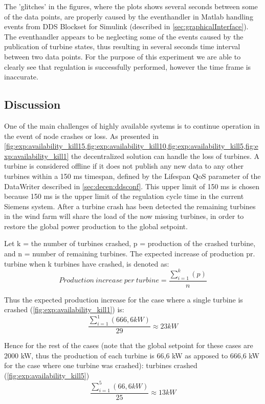 \FloatBarrier

The 'glitches' in the figures, where the plots shows several seconds between some of the data points, are properly caused by the eventhandler in Matlab handling events from DDS Blockset for Simulink (described in \cref{sec:graphicalInterface}). The eventhandler appears to be neglecting some of the events caused by the publication of turbine states, thus resulting in several seconds time interval between two data points. For the purpose of this experiment we are able to clearly see that regulation is successfully performed, however the time frame is inaccurate.

\subsection{Discussion}
One of the main challenges of highly available systems is to continue operation in the event of node crashes or loss. As presented in  \cref{fig:exp:availability_kill15,fig:exp:availability_kill10,fig:exp:availability_kill5,fig:exp:availability_kill1} the decentralized solution can handle the loss of turbines. A turbine is considered offline if it does not publish any new data to any other turbines within a 150 ms timespan, defined by the Lifespan QoS parameter of the DataWriter described in \cref{sec:decen:ddsconf}.
This upper limit of 150 ms is chosen because 150 ms is the upper limit of the regulation cycle time in the current Siemens system.
After a turbine crash has been detected the remaining turbines in the wind farm will share the load of the now missing turbines, in order to restore the global power production to the global setpoint.

Let k = the number of turbines crashed, p = production of the crashed turbine, and n = number of remaining turbines. The expected increase of production pr. turbine when k turbines have crashed, is denoted as: 
$$Production~increase~per~turbine = \frac{\sum\limits_{i=1}^k(p)}{n}$$

Thus the expected production increase for the case where a single turbine is crashed (\cref{fig:exp:availability_kill1}) is: $$\frac{\sum\limits_{i=1}^1(666,6kW)}{29}\approx23kW$$

Hence for the rest of the cases (note that the global setpoint for these cases are 2000 kW, thus the production of each turbine is 66,6 kW as apposed to 666,6 kW for the case where one turbine was crashed):
\newline\newline
{} turbines crashed (\cref{fig:exp:availability_kill5}) $$\frac{\sum\limits_{i=1}^5(66,6kW)}{25}\approx13kW$$

